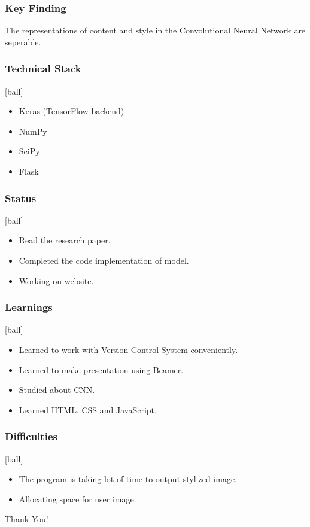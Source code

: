 \documentclass[14pt]{beamer}
\begin{document}
\begin{frame}
		\frametitle{Key Finding}
		The representations of content and style in the Convolutional Neural Network are seperable.
\end{frame}

\begin{frame}
		\frametitle{Technical Stack}
		\begin{itemize}
		\item Keras (TensorFlow backend)
		\item NumPy
		\item SciPy
		\item Flask  
		\end{itemize}
\end{frame}

\begin{frame}
		\frametitle{Status}
		\begin{itemize}
		\item Read the research paper.
		\item Completed the code implementation of model.
        \item Working on website.
		\end{itemize}
\end{frame}

\begin{frame}
		\frametitle{Learnings}
        \begin{itemize}
		\item Learned to work with Version Control System conveniently.
		\item Learned to make presentation using Beamer.
		\item Studied about CNN.
        \item Learned HTML, CSS and JavaScript.
		\end{itemize}
\end{frame}

\begin{frame}
		\frametitle{Difficulties}
        \begin{itemize}
				\item The program is taking lot of time to output stylized image.
                \item Allocating space for user image.
		\end{itemize}
\end{frame}

\begin{frame}
    \begin{center}  
       \Huge Thank You!
    \end{center}
\end{frame}
\end{document}

